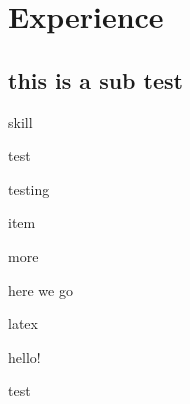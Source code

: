 \documentclass[11pt]{katz_resume}
\author{Harrison J Katz}
\begin{document}
\maketitle

\section{Experience}
\subsection{this is a sub test}

\begin{skills}{4}
\item[] skill
\item[] test
\item[] testing
\item[] item
\item[] more
\item[] here we go
\item[] latex
\item[] hello!
\item[] test
\end{skills}
\end{document}
